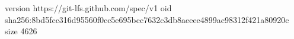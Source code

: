 version https://git-lfs.github.com/spec/v1
oid sha256:8bd5fcc316d95560f0cc5e695bcc7632c3db8aeeee4899ac98312f421a80920c
size 4626
